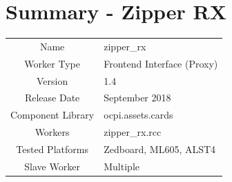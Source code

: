 \documentclass{article}
\author{} %
\date{Version \docVersion} %
\title{\docTitle}
\def\docVersion{1.4}
\def\comp{zipper\_rx}
\def\Comp{Zipper RX}
\begin{document}
\section*{Summary - \Comp}
\begin{tabular}{|c|M{13.5cm}|}
	\hline
	                  &                                        \\
	\hline
	Name              & \comp                                  \\
	\hline
	Worker Type       & Frontend Interface (Proxy)             \\
	\hline
	Version           & \docVersion \\
	\hline
	Release Date      & September 2018 \\
	\hline
	Component Library & ocpi.assets.cards \\
	\hline
	Workers           & zipper\_rx.rcc                      \\
	\hline
	Tested Platforms  & Zedboard, ML605, ALST4                      \\
	\hline
	Slave Worker      & Multiple                               \\
	\hline
\end{tabular}
\end{document}
